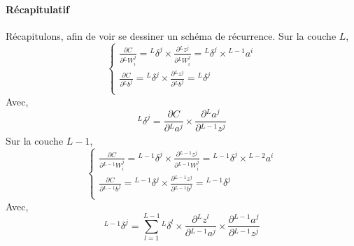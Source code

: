 \documentclass[a4paper, 10pt]{report}
\newcommand{\lexp}[1]{\phantom{}^{#1}}
\newcommand{\elem}[4]{\lexp{#2}#1^{#3}_{#4}}
\begin{document}
\paragraph{Récapitulatif}
Récapitulons, afin de voir se dessiner un schéma de récurrence.
Sur la couche $L$,
$$\left\{
\begin{array}{l}
	\frac{\partial C}{\partial \elem{W}{L}{j}{i}} = \elem{\delta}{L}{j}{} \times \frac{\partial \elem{z}{L}{j}{}}{\partial \elem{W}{L}{j}{i}} = \elem{\delta}{L}{j}{} \times \elem{a}{L-1}{i}{} 
	\\                                                                                                                                                                                        
	                                                                                                                                                                                            
	\frac{\partial C}{\partial \elem{b}{L}{j}{}} = \elem{\delta}{L}{j}{} \times \frac{\partial \elem{z}{L}{j}{}}{\partial \elem{b}{L}{j}{}} = \elem{\delta}{L}{j}{}                             
	\\                                                                                                                                                                                        
\end{array}
\right.$$
Avec,
$$\elem{\delta}{L}{j}{} = \frac{\partial C}{\partial \elem{a}{L}{j}{}} \times \frac{\partial \elem{a}{L}{j}{}}{\partial \elem{z}{L-1}{j}{}}$$
Sur la couche $L-1$,
$$\left\{
\begin{array}{l}
	\frac{\partial C}{\partial \elem{W}{L-1}{j}{i}} = \elem{\delta}{L-1}{j}{} \times \frac{\partial \elem{z}{L-1}{j}{}}{\partial \elem{W}{L-1}{j}{i}} = \elem{\delta}{L-1}{j}{} \times \elem{a}{L-2}{i}{} 
	\\                                                                                                                                                                                                  
	\frac{\partial C}{\partial \elem{b}{L-1}{j}{}} = \elem{\delta}{L-1}{j}{} \times \frac{\partial \elem{z}{L-1}{j}{}}{\partial \elem{b}{L-1}{j}{}} = \elem{\delta}{L-1}{j}{}                             
	\\                                                                                                                                                                                                  
\end{array}
\right.$$
Avec,
$$\elem{\delta}{L-1}{j}{} = \sum_{l=1}^{L-1}{\elem{\delta}{L}{l}{} \times \frac{\partial \elem{z}{L}{l}{}}{\partial \elem{a}{L-1}{j}{}}} \times \frac{\partial \elem{a}{L-1}{j}{}}{\partial \elem{z}{L-1}{j}{}}$$
\end{document}
